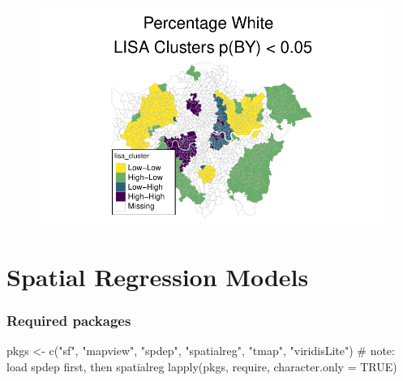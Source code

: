 \documentclass[
  letterpaper,
]{scrbook}
\newenvironment{Shaded}{\begin{snugshade}}{\end{snugshade}}
\newcommand{\AttributeTok}[1]{\textcolor[rgb]{0.40,0.45,0.13}{#1}}
\newcommand{\CommentTok}[1]{\textcolor[rgb]{0.37,0.37,0.37}{#1}}
\newcommand{\ConstantTok}[1]{\textcolor[rgb]{0.56,0.35,0.01}{#1}}
\newcommand{\FunctionTok}[1]{\textcolor[rgb]{0.28,0.35,0.67}{#1}}
\newcommand{\NormalTok}[1]{\textcolor[rgb]{0.00,0.23,0.31}{#1}}
\newcommand{\OtherTok}[1]{\textcolor[rgb]{0.00,0.23,0.31}{#1}}
\newcommand{\StringTok}[1]{\textcolor[rgb]{0.13,0.47,0.30}{#1}}
\begin{document}
\begin{figure}[H]

{\centering \includegraphics{04_dependence_files/figure-pdf/unnamed-chunk-22-1.pdf}

}

\end{figure}


\hypertarget{spatial-regression-models}{%
\chapter{Spatial Regression Models}\label{spatial-regression-models}}

\hypertarget{required-packages-5}{%
\subsection*{Required packages}\label{required-packages-5}}

\begin{Shaded}
\begin{Highlighting}[]
\NormalTok{pkgs }\OtherTok{\textless{}{-}} \FunctionTok{c}\NormalTok{(}\StringTok{"sf"}\NormalTok{, }\StringTok{"mapview"}\NormalTok{, }\StringTok{"spdep"}\NormalTok{, }\StringTok{"spatialreg"}\NormalTok{, }\StringTok{"tmap"}\NormalTok{, }\StringTok{"viridisLite"}\NormalTok{) }\CommentTok{\# note: load spdep first, then spatialreg}
\FunctionTok{lapply}\NormalTok{(pkgs, require, }\AttributeTok{character.only =} \ConstantTok{TRUE}\NormalTok{)}
\end{Highlighting}
\end{Shaded}
\end{document}

